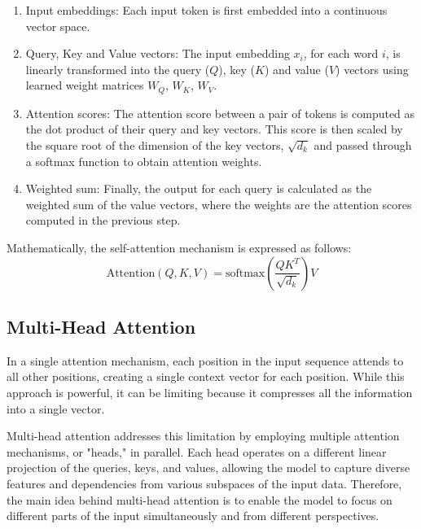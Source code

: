 \documentclass[11pt,english,listoffigures,listoftables]{tfgetsinf}
\begin{document}
\begin{enumerate}
    \item Input embeddings: Each input token is first embedded into a continuous vector space.
    
    \item Query, Key and Value vectors: The input embedding \( x_i \), for each word \( i \), is linearly transformed into the query (\(Q\)), key (\(K\)) and value (\(V\)) vectors using learned weight matrices \(W_Q\), \(W_K\), \(W_V\).

    \item Attention scores: The attention score between a pair of tokens is computed as the dot product of their query and key vectors. This score is then scaled by the square root of the dimension of the key vectors, \(\sqrt{d_k}\) and passed through a softmax function to obtain attention weights.

    \item Weighted sum: Finally, the output for each query is calculated as the weighted sum of the value vectors, where the weights are the attention scores computed in the previous step. 
\end{enumerate}

Mathematically, the self-attention mechanism is expressed as follows:
%
\begin{equation}
\text{Attention}(Q, K, V) = \text{softmax}\left(\frac{QK^T}{\sqrt{d_k}}\right)V
\end{equation}


\subsection{Multi-Head Attention}

In a single attention mechanism, each position in the input sequence attends to all other positions, creating a single context vector for each position. While this approach is powerful, it can be limiting because it compresses all the information into a single vector.

Multi-head attention addresses this limitation by employing multiple attention mechanisms, or "heads," in parallel. Each head operates on a different linear projection of the queries, keys, and values, allowing the model to capture diverse features and dependencies from various subspaces of the input data. Therefore, the main idea behind multi-head attention is to enable the model to focus on different parts of the input simultaneously and from different perspectives.
\end{document}
